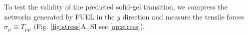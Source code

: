 \documentclass[nofootinbib,preprint,floatfix,titlepage,superscriptaddress]{revtex4} %
\newcommand{\outNim}[1]{}
\begin{document}
To test the validity of the predicted solid-gel transition,
we compress the networks generated by FUEL in the $y$ direction and measure the tensile forces 
$ \sigma_\mu \equiv T_{\mu\mu}$ (Fig. \ref{fig:stress}A, SI sec.\ref{ap:stress}). 
\outNim{
If the stress components $\sigma_x, \sigma_y$ and $\sigma_z$ have similar magnitude, as in hydrostatics, we have $ \sigma_\parallel ={1\over L^3} \int_\mathrm{net} d^3x |\sigma_y| = p$ and $\sigma_\perp = {1\over L^3} \int_\mathrm{net} d^3x \sqrt{\sigma_x^2+ \sigma_z^2} = \sqrt{2} p$, consequently
 $ \sigma_\parallel/\sigma_\perp = 1/\sqrt{2}$.
If, however, the $ \sigma_\parallel/\sigma_\perp$ ratio varies as we rotate the layout, the network possesses solid-like properties. 
}
\begin{figure}
    \centering
    

\end{figure}
\end{document}

